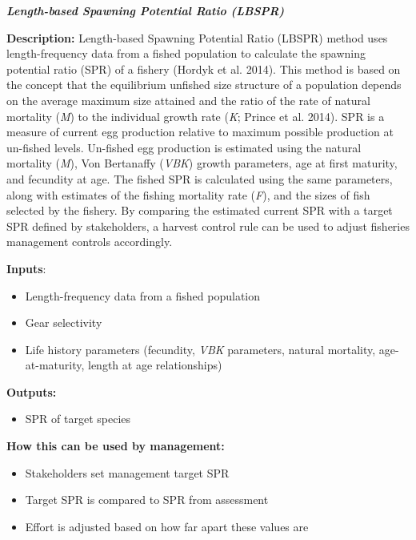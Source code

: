 \documentclass[]{book}
\providecommand{\tightlist}{%
  \setlength{\itemsep}{0pt}\setlength{\parskip}{0pt}}
\begin{document}
\textbf{\emph{Length-based Spawning Potential Ratio (LBSPR)}}

\textbf{Description:} Length-based Spawning Potential Ratio (LBSPR)
method uses length-frequency data from a fished population to calculate
the spawning potential ratio (SPR) of a fishery (Hordyk et al. 2014).
This method is based on the concept that the equilibrium unfished size
structure of a population depends on the average maximum size attained
and the ratio of the rate of natural mortality (\emph{M}) to the
individual growth rate (\emph{K}; Prince et al. 2014). SPR is a measure
of current egg production relative to maximum possible production at
un-fished levels. Un-fished egg production is estimated using the
natural mortality (\emph{M}), Von Bertanaffy (\emph{VBK}) growth
parameters, age at first maturity, and fecundity at age. The fished SPR
is calculated using the same parameters, along with estimates of the
fishing mortality rate (\emph{F}), and the sizes of fish selected by the
fishery. By comparing the estimated current SPR with a target SPR
defined by stakeholders, a harvest control rule can be used to adjust
fisheries management controls accordingly.

\textbf{Inputs}:

\begin{itemize}
\tightlist
\item
  Length-frequency data from a fished population
\end{itemize}

\begin{itemize}
\item
  Gear selectivity
\item
  Life history parameters (fecundity, \emph{VBK} parameters, natural
  mortality, age-at-maturity, length at age relationships)
\end{itemize}

\textbf{Outputs:}

\begin{itemize}
\tightlist
\item
  SPR of target species
\end{itemize}

\textbf{How this can be used by management: }

\begin{itemize}
\item
  Stakeholders set management target SPR
\item
  Target SPR is compared to SPR from assessment
\item
  Effort is adjusted based on how far apart these values are
\end{itemize}
\end{document}
